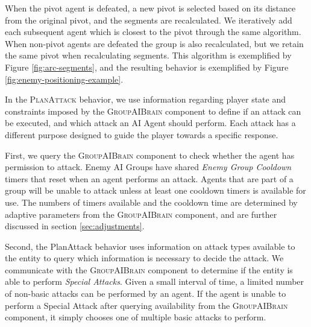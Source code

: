 When the pivot agent is defeated, a new pivot is selected based on its distance from the original pivot, and the segments are recalculated. We iteratively add each subsequent agent which is closest to the pivot through the same algorithm. When non-pivot agents are defeated the group is also recalculated, but we retain the same pivot when recalculating segments. This algorithm is exemplified by Figure \ref{fig:arc-segments}, and the resulting behavior is exemplified by Figure \ref{fig:enemy-positioning-example}.





In the \textsc{PlanAttack} behavior, we use information regarding player state and constraints imposed by the \textsc{GroupAIBrain} component to define if an attack can be executed, and which attack an AI Agent should perform. Each attack has a different purpose designed to guide the player towards a specific response.

First, we query the \textsc{GroupAIBrain} component to check whether the agent has permission to attack. Enemy AI Groups have shared  \emph{Enemy Group Cooldown} timers that reset when an agent performs an attack. Agents that are part of a group will be unable to attack unless at least one cooldown timers is available for use. The numbers of timers available and the cooldown time are determined by adaptive parameters from the \textsc{GroupAIBrain} component, and are further discussed in section \ref{sec:adjustments}.

Second, the PlanAttack behavior uses information on attack types available to the entity to query which information is necessary to decide the attack. We communicate with the \textsc{GroupAIBrain} component to determine if the entity is able to perform \emph{Special Attacks}. Given a small interval of time, a limited number of non-basic attacks can be performed by an agent. If the agent is unable to perform a Special Attack after querying availability from the \textsc{GroupAIBrain} component, it simply chooses one of multiple basic attacks to perform.

